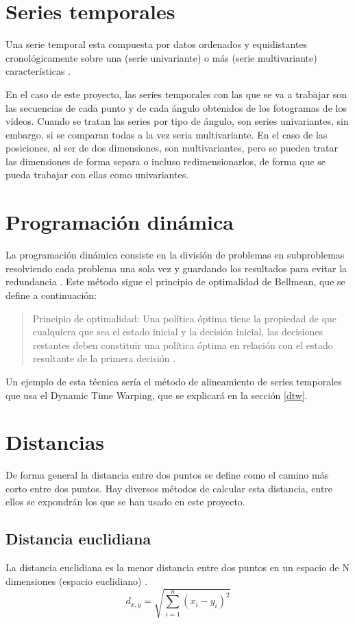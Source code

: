 \section{Series temporales}
Una serie temporal esta compuesta por datos ordenados y equidistantes cronológicamente sobre una (serie univariante) o más (serie multivariante) características \cite{seriestemporales}.

En el caso de este proyecto, las series temporales con las que se va a trabajar son las secuencias de cada punto y de cada ángulo obtenidos de los fotogramas de los vídeos. Cuando se tratan las series por tipo de ángulo, son series univariantes, sin embargo, si se comparan todas a la vez seria multivariante. En el caso de las posiciones, al ser de dos dimensiones, son multivariantes, pero se pueden tratar las dimensiones de forma separa o incluso redimensionarlos, de forma que se pueda trabajar con ellas como univariantes.

\section{Programación dinámica}
La programación dinámica consiste en la división de problemas en subproblemas resolviendo cada problema una sola vez y guardando los resultados para evitar la redundancia \cite{dynprog}. Este método sigue el principio de optimalidad de Bellmean, que se define a continuación:

\begin{quote}
	Principio de optimalidad: Una política óptima tiene la propiedad de que cualquiera que sea el estado inicial y la decisión inicial, las decisiones restantes deben constituir una política óptima en relación con el estado resultante de la primera decisión \cite{bellman1962applied}.
	\label{quotebellman}
\end{quote}

Un ejemplo de esta técnica sería el método de alineamiento de series temporales que usa el Dynamic Time Warping, que se explicará en la sección \ref{dtw}.


\section{Distancias}
De forma general la distancia entre dos puntos se define como el camino más corto entre dos puntos. Hay diversos métodos de calcular esta distancia, entre ellos se expondrán los que se han usado en este proyecto.

\subsection{Distancia euclidiana}
La distancia euclidiana es la menor distancia entre dos puntos en un espacio de N dimensiones (espacio euclidiano) \cite{distandnorm}.
\begin{equation}
	d_{x,y}=\sqrt{\sum_{i=1}^{n}(x_i-y_i)^2}
\end{equation}
 
